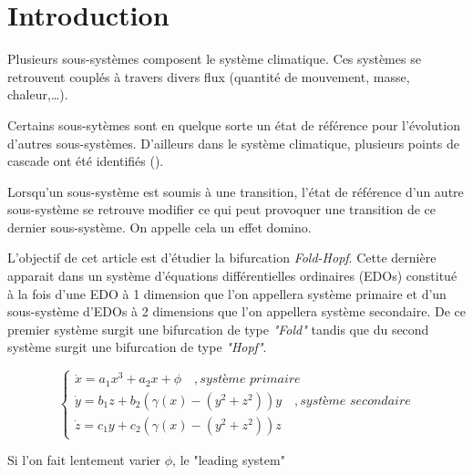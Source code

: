 \section{Introduction}

Plusieurs sous-systèmes composent le système climatique. Ces systèmes se retrouvent couplés à travers divers flux (quantité de mouvement, masse, chaleur,\dots).

Certains sous-sytèmes sont en quelque sorte un état de référence pour l'évolution d'autres sous-systèmes. D'ailleurs dans le système climatique, plusieurs points de cascade ont été identifiés (\cite{Lenton_Held_Kriegler_Hall_Lucht_Rahmstorf_Schellnhuber_2008}).

Lorsqu'un sous-système est soumis à une transition, l'état de référence d'un autre sous-système se retrouve modifier ce qui peut provoquer une transition de ce dernier sous-système. On appelle cela un effet domino.


L'objectif de cet article est d'étudier la bifurcation \emph{Fold-Hopf}. Cette dernière apparait dans un système d'équations différentielles ordinaires (EDOs) constitué à la fois d'une EDO à 1 dimension que l'on appellera système primaire et d'un sous-système d'EDOs à 2 dimensions que l'on appellera système secondaire. De ce premier système surgit une bifurcation de type \emph{"Fold"} tandis que du second système surgit une bifurcation de type \emph{"Hopf"}.

\begin{equation}
  \begin{cases}
    \dot{x} = a_1x^3 + a_2x + \phi \quad, \textit{système primaire} \\
    \dot{y} = b_1z + b_2(\gamma(x) - (y^2 + z^2))y \quad, \textit{système secondaire} \\
    \dot{z} = c_1y + c_2(\gamma(x) - (y^2 + z^2))z
  \end{cases}
\end{equation}

Si l'on fait lentement varier $\phi$, le "leading system"
